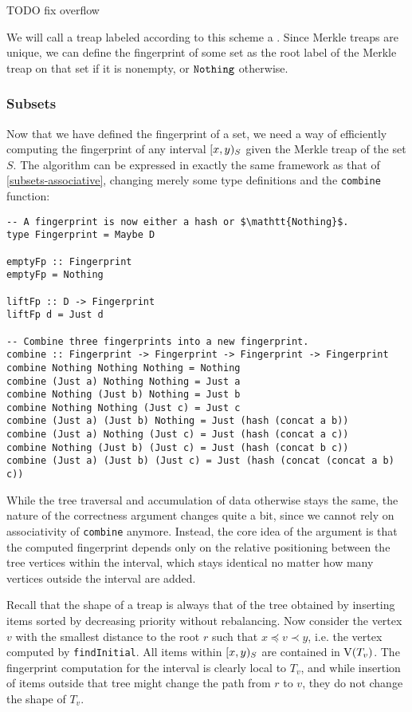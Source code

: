 TODO fix overflow

We will call a treap labeled according to this scheme a . Since Merkle treaps are unique, we can define the fingerprint of some set as the root label of the Merkle treap on that set if it is nonempty, or $\mathtt{Nothing}$ otherwise.

\subsubsection{Subsets}

Now that we have defined the fingerprint of a set, we need a way of efficiently computing the fingerprint of any interval $[{x},{y})_{S}$ given the Merkle treap of the set $S$. The algorithm can be expressed in exactly the same framework as that of \cref{subsets-associative}, changing merely some type definitions and the \texttt{combine} function:

\begin{verbatim}
-- A fingerprint is now either a hash or $\mathtt{Nothing}$.
type Fingerprint = Maybe D

emptyFp :: Fingerprint
emptyFp = Nothing

liftFp :: D -> Fingerprint
liftFp d = Just d

-- Combine three fingerprints into a new fingerprint.
combine :: Fingerprint -> Fingerprint -> Fingerprint -> Fingerprint
combine Nothing Nothing Nothing = Nothing
combine (Just a) Nothing Nothing = Just a
combine Nothing (Just b) Nothing = Just b
combine Nothing Nothing (Just c) = Just c
combine (Just a) (Just b) Nothing = Just (hash (concat a b))
combine (Just a) Nothing (Just c) = Just (hash (concat a c))
combine Nothing (Just b) (Just c) = Just (hash (concat b c))
combine (Just a) (Just b) (Just c) = Just (hash (concat (concat a b) c))
\end{verbatim}

While the tree traversal and accumulation of data otherwise stays the same, the nature of the correctness argument changes quite a bit, since we cannot rely on associativity of \texttt{combine} anymore. Instead, the core idea of the argument is that the computed fingerprint depends only on the relative positioning between the tree vertices within the interval, which stays identical no matter how many vertices outside the interval are added.

Recall that the shape of a treap is always that of the tree obtained by inserting items sorted by decreasing priority without rebalancing. Now consider the vertex $v$ with the smallest distance to the root $r$ such that $x \preceq v \prec y$, i.e. the vertex computed by \texttt{findInitial}. All items within $[{x},{y})_{S}$ are contained in $\operatorname{V}(T_v)$. The fingerprint computation for the interval is clearly local to $T_v$, and while insertion of items outside that tree might change the path from $r$ to $v$, they do not change the shape of $T_v$.

